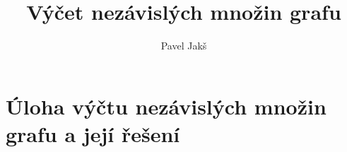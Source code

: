 \documentclass{article}
\title{Výčet nezávislých množin grafu}
\author{Pavel Jakš}
\begin{document}
\maketitle

\section{Úloha výčtu nezávislých množin grafu a její řešení}
\end{document}
